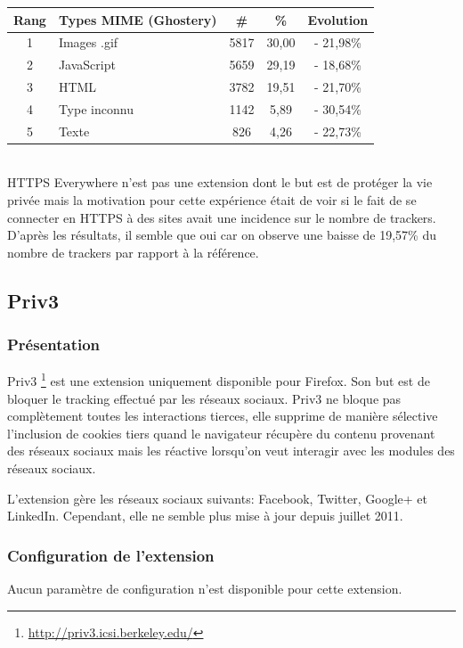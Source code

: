 \begin{tabular}{ c | p{5cm} | c | c | c | }
   Rang & Types MIME (Ghostery) & \# & \% & Evolution\\
   \hline
   \hline
   1 & Images .gif & 5817 & 30,00 & - 21,98\% \\
   2 & JavaScript & 5659 & 29,19 & - 18,68\% \\
   3 & HTML & 3782 & 19,51 & - 21,70\% \\
   4 & Type inconnu & 1142 & 5,89 & - 30,54\% \\
   5 & Texte & 826 & 4,26 & - 22,73\% \\
   \hline
\end{tabular}
\\[.3cm]

HTTPS Everywhere n'est pas une extension dont le but est de protéger la vie privée mais la motivation pour cette expérience était de voir si le fait de se connecter en HTTPS à des sites avait une incidence sur le nombre de trackers. D'après les résultats, il semble que oui car on observe une baisse de 19,57\% du nombre de trackers par rapport à la référence.


\subsection{Priv3}
\subsubsection{Présentation}
Priv3 \footnote{\url{http://priv3.icsi.berkeley.edu/}} est une extension uniquement disponible pour Firefox. Son but est de bloquer le tracking effectué par les réseaux sociaux. Priv3 ne bloque pas complètement toutes les interactions tierces, elle supprime de manière sélective l'inclusion de cookies tiers quand le navigateur récupère du contenu provenant des réseaux sociaux mais les réactive lorsqu'on veut interagir avec les modules des réseaux sociaux.
\newline

L'extension gère les réseaux sociaux suivants: Facebook, Twitter, Google+ et LinkedIn. Cependant, elle ne semble plus mise à jour depuis juillet 2011.

\subsubsection{Configuration de l'extension}
Aucun paramètre de configuration n'est disponible pour cette extension.


